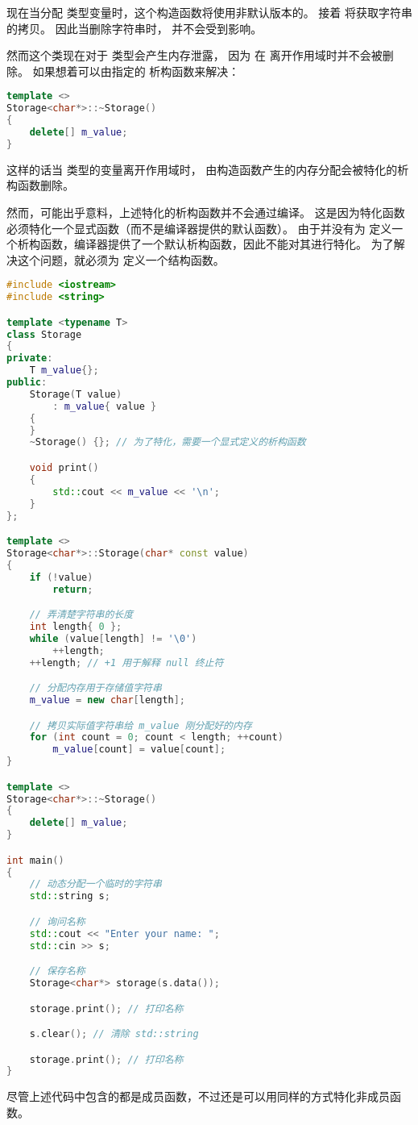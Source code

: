 \documentclass[../../LearnCpp.tex]{subfiles}
\begin{document}
现在当分配  类型变量时，这个构造函数将使用非默认版本的。
接着  将获取字符串的拷贝。
因此当删除字符串时， 并不会受到影响。

然而这个类现在对于  类型会产生内存泄露，
因为  在  离开作用域时并不会被删除。
如果想着可以由指定的  析构函数来解决：

\begin{lstlisting}[language=C++]
template <>
Storage<char*>::~Storage()
{
    delete[] m_value;
}
\end{lstlisting}

这样的话当  类型的变量离开作用域时，
由构造函数产生的内存分配会被特化的析构函数删除。

然而，可能出乎意料，上述特化的析构函数并不会通过编译。
这是因为特化函数必须特化一个显式函数（而不是编译器提供的默认函数）。
由于并没有为  定义一个析构函数，编译器提供了一个默认析构函数，因此不能对其进行特化。
为了解决这个问题，就必须为  定义一个结构函数。

\begin{lstlisting}[language=C++]
#include <iostream>
#include <string>

template <typename T>
class Storage
{
private:
    T m_value{};
public:
    Storage(T value)
        : m_value{ value }
    {
    }
    ~Storage() {}; // 为了特化，需要一个显式定义的析构函数

    void print()
    {
        std::cout << m_value << '\n';
    }
};

template <>
Storage<char*>::Storage(char* const value)
{
    if (!value)
        return;

    // 弄清楚字符串的长度
    int length{ 0 };
    while (value[length] != '\0')
        ++length;
    ++length; // +1 用于解释 null 终止符

    // 分配内存用于存储值字符串
    m_value = new char[length];

    // 拷贝实际值字符串给 m_value 刚分配好的内存
    for (int count = 0; count < length; ++count)
        m_value[count] = value[count];
}

template <>
Storage<char*>::~Storage()
{
    delete[] m_value;
}

int main()
{
    // 动态分配一个临时的字符串
    std::string s;

    // 询问名称
    std::cout << "Enter your name: ";
    std::cin >> s;

    // 保存名称
    Storage<char*> storage(s.data());

    storage.print(); // 打印名称

    s.clear(); // 清除 std::string

    storage.print(); // 打印名称
}
\end{lstlisting}

尽管上述代码中包含的都是成员函数，不过还是可以用同样的方式特化非成员函数。
\end{document}
